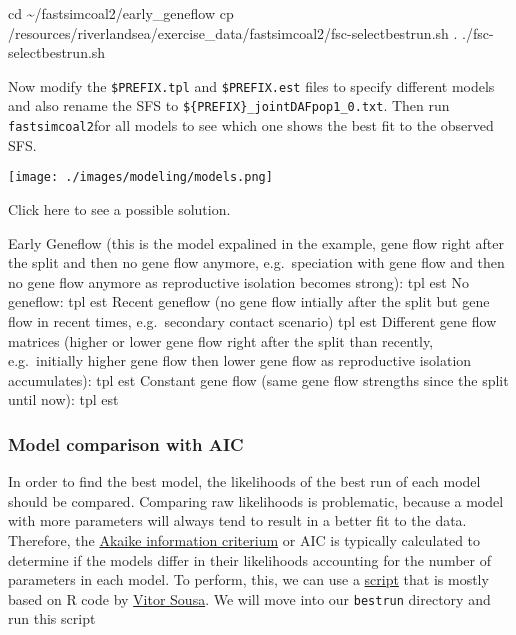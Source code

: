 \documentclass[
  letterpaper,
  DIV=11,
  numbers=noendperiod]{scrartcl}
\newenvironment{Shaded}{\begin{snugshade}}{\end{snugshade}}
\newcommand{\NormalTok}[1]{\textcolor[rgb]{0.00,0.23,0.31}{#1}}
\begin{document}
\begin{Shaded}
\begin{Highlighting}[]
\NormalTok{cd \textasciitilde{}/fastsimcoal2/early\_geneflow}
\NormalTok{cp /resources/riverlandsea/exercise\_data/fastsimcoal2/fsc{-}selectbestrun.sh .}
\NormalTok{./fsc{-}selectbestrun.sh}
\end{Highlighting}
\end{Shaded}

Now modify the \texttt{\$PREFIX.tpl} and \texttt{\$PREFIX.est} files to
specify different models and also rename the SFS to
\texttt{\$\{PREFIX\}\_jointDAFpop1\_0.txt}. Then run
\texttt{fastsimcoal2}for all models to see which one shows the best fit
to the observed SFS.

\texttt{[image: ./images/modeling/models.png]}

Click here to see a possible solution.

Early Geneflow (this is the model expalined in the example, gene flow
right after the split and then no gene flow anymore, e.g.~speciation
with gene flow and then no gene flow anymore as reproductive isolation
becomes strong): tpl est No geneflow: tpl est Recent geneflow (no gene
flow intially after the split but gene flow in recent times,
e.g.~secondary contact scenario) tpl est Different gene flow matrices
(higher or lower gene flow right after the split than recently,
e.g.~initially higher gene flow then lower gene flow as reproductive
isolation accumulates): tpl est Constant gene flow (same gene flow
strengths since the split until now): tpl est

\hypertarget{model-comparison-with-aic}{%
\subsubsection{Model comparison with
AIC}\label{model-comparison-with-aic}}

In order to find the best model, the likelihoods of the best run of each
model should be compared. Comparing raw likelihoods is problematic,
because a model with more parameters will always tend to result in a
better fit to the data. Therefore, the
\href{https://en.wikipedia.org/wiki/Akaike_information_criterion}{Akaike
information criterium} or AIC is typically calculated to determine if
the models differ in their likelihoods accounting for the number of
parameters in each model. To perform, this, we can use a
\href{https://github.com/speciationgenomics/scripts/blob/master/calculateAIC.sh}{script}
that is mostly based on R code by
\href{http://ce3c.ciencias.ulisboa.pt/member/vitorsousa}{Vitor Sousa}.
We will move into our \texttt{bestrun} directory and run this script
\end{document}
